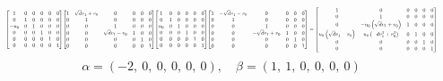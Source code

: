 \documentclass[11pt]{article}
\theoremstyle{definition}
\begin{document}
\[
\scaletoalign{\textwidth}{{\left[\begin{matrix}1 & 0 & 0 & 0 & 0 & 0\\0 & 1 & 0 & 0 & 0 & 0\\- u_{0} & 0 & 1 & 0 & 0 & 0\\0 & 0 & 0 & 1 & 0 & 0\\0 & 0 & 0 & 0 & 1 & 0\\0 & 0 & 0 & 0 & 0 & 1\end{matrix}\right]} {\left[\begin{matrix}1 & \sqrt{d} v_{1} + v_{0} & 0 & 0 & 0 & 0\\0 & 1 & 0 & 0 & 0 & 0\\0 & 0 & 1 & 0 & 0 & 0\\0 & 0 & \sqrt{d} v_{1} - v_{0} & 1 & 0 & 0\\0 & 0 & 0 & 0 & 1 & 0\\0 & 0 & 0 & 0 & 0 & 1\end{matrix}\right]} {\left[\begin{matrix}1 & 0 & 0 & 0 & 0 & 0\\0 & 1 & 0 & 0 & 0 & 0\\u_{0} & 0 & 1 & 0 & 0 & 0\\0 & 0 & 0 & 1 & 0 & 0\\0 & 0 & 0 & 0 & 1 & 0\\0 & 0 & 0 & 0 & 0 & 1\end{matrix}\right]} {\left[\begin{matrix}1 & - \sqrt{d} v_{1} - v_{0} & 0 & 0 & 0 & 0\\0 & 1 & 0 & 0 & 0 & 0\\0 & 0 & 1 & 0 & 0 & 0\\0 & 0 & - \sqrt{d} v_{1} + v_{0} & 1 & 0 & 0\\0 & 0 & 0 & 0 & 1 & 0\\0 & 0 & 0 & 0 & 0 & 1\end{matrix}\right]} = {\left[\begin{matrix}1 & 0 & 0 & 0 & 0 & 0\\0 & 1 & 0 & 0 & 0 & 0\\0 & - u_{0} \left(\sqrt{d} v_{1} + v_{0}\right) & 1 & 0 & 0 & 0\\u_{0} \left(\sqrt{d} v_{1} - v_{0}\right) & u_{0} \left(- d v_{1}^{2} + v_{0}^{2}\right) & 0 & 1 & 0 & 0\\0 & 0 & 0 & 0 & 1 & 0\\0 & 0 & 0 & 0 & 0 & 1\end{matrix}\right]}}
\]
\[
\alpha = \left( -2, \  0, \  0, \  0, \  0, \  0\right), \quad \beta = \left( 1, \  1, \  0, \  0, \  0, \  0\right)
\]
\end{document}
